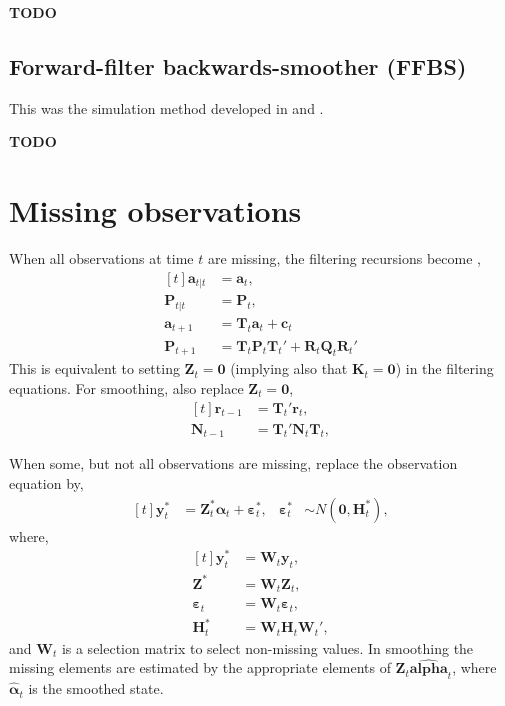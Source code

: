 \documentclass[]{book}
\newcommand{\mat}[1]{\boldsymbol{#1}}
\renewcommand{\vec}[1]{\boldsymbol{#1}}
\renewcommand{\T}{'}
\begin{document}
\textbf{TODO}

\subsection{Forward-filter backwards-smoother
(FFBS)}\label{forward-filter-backwards-smoother-ffbs}

This was the simulation method developed in \textcite{CarterKohn1994}
and \textcite{Fruehwirth-Schnatter1994} .

\textbf{TODO}

\section{Missing observations}\label{missing-observations}

When all observations at time \(t\) are missing, the filtering
recursions become \autocite[Sec 4.10]{DurbinKoopman2012}, \[
\begin{aligned}[t]
\vec{a}_{t|t} &= \vec{a}_t , \\
\mat{P}_{t|t} &= \mat{P}_t , \\
\vec{a}_{t + 1} &= \mat{T}_t \vec{a}_t + \vec{c}_t \\
\mat{P}_{t + 1} &= \mat{T}_t \mat{P}_t \mat{T}_t\T + \mat{R}_t \mat{Q}_t \mat{R}_t\T
\end{aligned}
\] This is equivalent to setting \(\mat{Z}_t = \mat{0}\) (implying also
that \(\mat{K}_t = \mat{0}\)) in the filtering equations. For smoothing,
also replace \(\mat{Z}_t = \mat{0}\), \[
\begin{aligned}[t]
\vec{r}_{t - 1} &= \mat{T}_t\T \vec{r}_t , \\
\mat{N}_{t - 1} &= \mat{T}_t\T \mat{N}_t \mat{T}_t,
\end{aligned}
\]

When some, but not all observations are missing, replace the observation
equation by, \[
\begin{aligned}[t]
\vec{y}^*_t &= \mat{Z}^*_t \vec{\alpha}_t + \vec{\varepsilon}_t^*, & \vec{\varepsilon}_t^* &\sim N(\vec{0}, \mat{H}_t^*),
\end{aligned}
\] where, \[
\begin{aligned}[t]
\vec{y}^*_t &= \mat{W}_t \vec{y}_t, \\
\mat{Z}^* &= \mat{W}_t \mat{Z}_t , \\
\vec{\varepsilon}_t &= \mat{W}_t \vec{\varepsilon}_t , \\
\mat{H}^*_t &= \mat{W}_t \mat{H}_t \mat{W}_t\T ,
\end{aligned}
\] and \(\mat{W}_t\) is a selection matrix to select non-missing values.
In smoothing the missing elements are estimated by the appropriate
elements of \(\mat{Z}_t \hat{\vec{alpha}}_t\), where
\(\hat{\vec{\alpha}}_t\) is the smoothed state.
\end{document}
